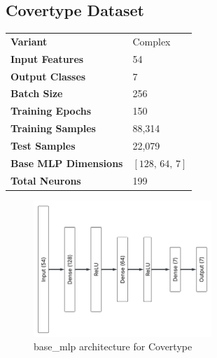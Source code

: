 \subsection{Covertype Dataset}

\begin{tabular}{@{}ll@{}}
\textbf{Variant} & Complex \\
\textbf{Input Features} & 54 \\
\textbf{Output Classes} & 7 \\
\textbf{Batch Size} & 256 \\
\textbf{Training Epochs} & 150 \\
\textbf{Training Samples} & 88,314 \\
\textbf{Test Samples} & 22,079 \\
\textbf{Base MLP Dimensions} & $[128,\, 64,\, 7]$ \\
\textbf{Total Neurons} & 199 \\
\end{tabular}

\begin{figure}[H]
    \centering
    \includegraphics[height=0.28\textheight,width=0.6\textwidth]{Figures/Results/Covertype/Covertype_base_mlp_architecture.png} 
    \captionsetup{justification=centering}  %
    \caption{base\_mlp architecture for Covertype}
    \label{fig:covertypeMlpBaseArch}
\end{figure}

